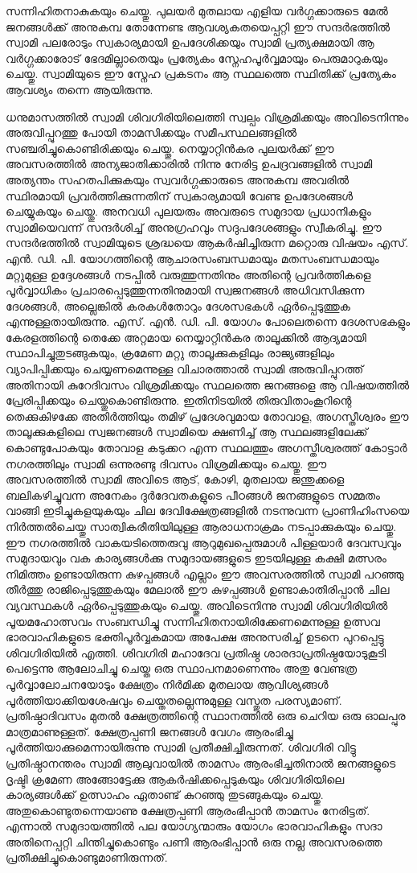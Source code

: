 \documentclass[12pt,openany]{book}
\begin{document}
സന്നിഹിതനാകുകയും ചെയ്തു. പുലയർ മുതലായ എളിയ വർഗ്ഗക്കാരുടെ മേൽ ജനങ്ങൾക്ക് അനുകമ്പ തോന്നേണ്ട ആവശ്യകതയെപ്പറ്റി ഈ സന്ദർഭത്തിൽ സ്വാമി പലരോടും സ്വകാര്യമായി ഉപദേശിക്കയും സ്വാമി പ്രത്യക്ഷമായി ആ വർഗ്ഗക്കാരോട് ഭേദമില്ലാതെയും പ്രത്യേകം സ്നേഹപൂർവ്വമായും പെരുമാറുകയും ചെയ്തു. സ്വാമിയുടെ ഈ സ്നേഹ പ്രകടനം ആ സ്ഥലത്തെ സ്ഥിതിക്ക് പ്രത്യേകം ആവശ്യം തന്നെ ആയിരുന്നു.
	
	ധനുമാസത്തിൽ സ്വാമി ശിവഗിരിയിലെത്തി സ്വല്പം വിശ്രമിക്കയും അവിടെനിന്നും അരുവിപ്പുറത്തു പോയി താമസിക്കയും സമീപസ്ഥലങ്ങളിൽ സഞ്ചരിച്ചുകൊണ്ടിരിക്കയും ചെയ്തു. നെയ്യാറ്റിൻകര പുലയർക്ക് ഈ അവസരത്തിൽ അന്യജാതിക്കാരിൽ നിന്നു നേരിട്ട ഉപദ്രവങ്ങളിൽ സ്വാമി അത്യന്തം സഹതപിക്കുകയും സ്വവർഗ്ഗക്കാരുടെ അനുകമ്പ അവരിൽ സ്ഥിരമായി പ്രവർത്തിക്കുന്നതിന് സ്വകാര്യമായി വേണ്ട ഉപദേശങ്ങൾ ചെയ്യുകയും ചെയ്തു. അനവധി പുലയരും അവരുടെ സമുദായ പ്രധാനികളും സ്വാമിയെവന്ന് സന്ദർശിച്ച് അനുഗ്രഹവും സദുപദേശങ്ങളും സ്വീകരിച്ചു. ഈ സന്ദർഭത്തിൽ സ്വാമിയുടെ ശ്രദ്ധയെ ആകർഷിച്ചിരുന്ന മറ്റൊരു വിഷയം എസ്. എൻ. ഡി. പി. യോഗത്തിന്റെ ആചാരസംബന്ധമായും മതസംബന്ധമായും മറ്റുമുള്ള ഉദ്ദേശങ്ങൾ നടപ്പിൽ വരുത്തുന്നതിനും അതിന്റെ പ്രവർത്തികളെ പൂർവ്വാധികം പ്രചാരപ്പെടുത്തുന്നതിനുമായി സ്വജനങ്ങൾ അധിവസിക്കുന്ന ദേശങ്ങൾ, അല്ലെങ്കിൽ കരകൾതോറും ദേശസഭകൾ ഏർപ്പെടുത്തുക എന്നുള്ളതായിരുന്നു. എസ്. എൻ. ഡി. പി. യോഗം പോലെതന്നെ ദേശസഭകളും കേരളത്തിന്റെ തെക്കേ അറ്റമായ നെയ്യാറ്റിൻകര താലൂക്കിൽ ആദ്യമായി സ്ഥാപിച്ചുതുടങ്ങുകയും, ക്രമേണ മറ്റു താലൂക്കുകളിലും രാജ്യങ്ങളിലും വ്യാപിപ്പിക്കയും ചെയ്യണമെന്നുള്ള വിചാരത്താൽ സ്വാമി അരുവിപ്പുറത്ത് അതിനായി കുറേദിവസം വിശ്രമിക്കയും സ്ഥലത്തെ ജനങ്ങളെ ആ വിഷയത്തിൽ പ്രേരിപ്പിക്കയും ചെയ്തുകൊണ്ടിരുന്നു. ഇതിനിടയിൽ തിരുവിതാംകൂറിന്റെ തെക്കുകിഴക്കേ അതിർത്തിയും തമിഴ് പ്രദേശവുമായ തോവാള, അഗസ്തീശ്വരം ഈ താലൂക്കുകളിലെ സ്വജനങ്ങൾ സ്വാമിയെ ക്ഷണിച്ച് ആ സ്ഥലങ്ങളിലേക്ക് കൊണ്ടുപോകയും തോവാള കടുക്കറ എന്ന സ്ഥലത്തും അഗസ്തീശ്വരത്ത് കോട്ടാർ നഗരത്തിലും സ്വാമി ഒന്നുരണ്ടു ദിവസം വിശ്രമിക്കയും ചെയ്തു. ഈ അവസരത്തിൽ സ്വാമി അവിടെ ആട്, കോഴി, മുതലായ ജന്തുക്കളെ ബലികഴിച്ചുവന്ന അനേകം ദുർദേവതകളുടെ പീഠങ്ങൾ ജനങ്ങളുടെ സമ്മതം വാങ്ങി ഇടിച്ചുകളയുകയും ചില ദേവിക്ഷേത്രങ്ങളിൽ നടന്നുവന്ന പ്രാണിഹിംസയെ നിർത്തൽചെയ്തു സാത്വികരീതിയിലുള്ള ആരാധനാക്രമം നടപ്പാക്കുകയും ചെയ്തു. ഈ നഗരത്തിൽ വാകയടിത്തെരുവു ആറുമുഖപ്പെരുമാൾ പിള്ളയാർ ദേവസ്വവും സമുദായവും വക കാര്യങ്ങൾക്കു സമുദായങ്ങളുടെ ഇടയിലുള്ള കക്ഷി മത്സരം നിമിത്തം ഉണ്ടായിരുന്ന കുഴപ്പങ്ങൾ എല്ലാം ഈ അവസരത്തിൽ സ്വാമി പറഞ്ഞു തീർത്തു രാജിപ്പെടുത്തുകയും മേലാൽ ഈ കുഴപ്പങ്ങൾ ഉണ്ടാകാതിരിപ്പാൻ ചില വ്യവസ്ഥകൾ ഏർപ്പെടുത്തുകയും ചെയ്തു. അവിടെനിന്നു സ്വാമി ശിവഗിരിയിൽ പൂയമഹോത്സവം സംബന്ധിച്ചു സന്നിഹിതനായിരിക്കേണമെന്നുള്ള ഉത്സവ ഭാരവാഹികളുടെ ഭക്തിപൂർവ്വകമായ അപേക്ഷ അനുസരിച്ച് ഉടനെ പുറപ്പെട്ടു ശിവഗിരിയിൽ എത്തി. ശിവഗിരി മഹാദേവ പ്രതിഷ്ഠ ശാരദാപ്രതിഷ്ഠയോടുകൂടി പെട്ടെന്നു ആലോചിച്ചു ചെയ്ത ഒരു സ്ഥാപനമാണെന്നും അതു വേണ്ടത്ര പൂർവ്വാലോചനയോടും ക്ഷേത്രം നിർമിക്ക മുതലായ ആവിശ്യങ്ങൾ പൂർത്തിയാക്കിയശേഷവും ചെയ്തതല്ലെന്നുമുള്ള വസ്തുത പരസ്യമാണ്. പ്രതിഷ്ഠാദിവസം മുതൽ ക്ഷേത്രത്തിന്റെ സ്ഥാനത്തിൽ ഒരു ചെറിയ ഒരു ഓലപ്പുര മാത്രമാണുള്ളത്. ക്ഷേത്രപ്പണി ജനങ്ങൾ വേഗം ആരംഭിച്ചു പൂർത്തിയാക്കുമെന്നായിരുന്നു സ്വാമി പ്രതീക്ഷിച്ചിരുന്നത്. ശിവഗിരി വിട്ടു പ്രതിഷ്ഠാനന്തരം സ്വാമി ആലുവായിൽ താമസം ആരംഭിച്ചതിനാൽ ജനങ്ങളുടെ ദൃഷ്ടി ക്രമേണ അങ്ങോട്ടേക്കു ആകർഷിക്കപ്പെടുകയും ശിവഗിരിയിലെ കാര്യങ്ങൾക്ക് ഉത്സാഹം ഏതാണ്ട് കുറഞ്ഞു തുടങ്ങുകയും ചെയ്തു. അതുകൊണ്ടുതന്നെയാണു ക്ഷേത്രപ്പണി ആരംഭിപ്പാൻ താമസം നേരിട്ടത്. എന്നാൽ സമുദായത്തിൽ പല യോഗ്യന്മാരും യോഗം ഭാരവാഹികളും സദാ അതിനെപ്പറ്റി ചിന്തിച്ചുകൊണ്ടും പണി ആരംഭിപ്പാൻ ഒരു നല്ല അവസരത്തെ പ്രതീക്ഷിച്ചുകൊണ്ടുമാണിരുന്നത്.
	
\end{document}
